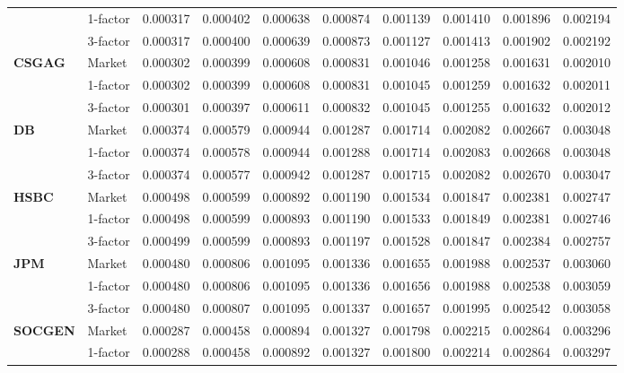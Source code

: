 \documentclass[12pt,a4paper]{article}
\theoremstyle{plain}
\numberwithin{equation}{section}
\begin{document}
{\begin{table}[t]
{\begin{tabular}{|rl|cccccccc|}
\cmidrule{3-10}          & 1-factor & 0.000317 & 0.000402 & 0.000638 & 0.000874 & 0.001139 & 0.001410 & 0.001896 & 0.002194 \\
          & 3-factor & 0.000317 & 0.000400 & 0.000639 & 0.000873 & 0.001127 & 0.001413 & 0.001902 & 0.002192 \\
    \hline
    \hline
    \multicolumn{1}{|l}{\textbf{CSGAG}} & Market & 0.000302 & 0.000399 & 0.000608 & 0.000831 & 0.001046 & 0.001258 & 0.001631 & 0.002010 \\
\cmidrule{3-10}          & 1-factor & 0.000302 & 0.000399 & 0.000608 & 0.000831 & 0.001045 & 0.001259 & 0.001632 & 0.002011 \\
          & 3-factor & 0.000301 & 0.000397 & 0.000611 & 0.000832 & 0.001045 & 0.001255 & 0.001632 & 0.002012 \\
    \hline
 \hline
    \multicolumn{1}{|l}{\textbf{DB}} & Market & 0.000374 & 0.000579 & 0.000944 & 0.001287 & 0.001714 & 0.002082 & 0.002667 & 0.003048 \\
\cmidrule{3-10}          & 1-factor & 0.000374 & 0.000578 & 0.000944 & 0.001288 & 0.001714 & 0.002083 & 0.002668 & 0.003048 \\
          & 3-factor & 0.000374 & 0.000577 & 0.000942 & 0.001287 & 0.001715 & 0.002082 & 0.002670 & 0.003047 \\
    \hline
   \hline
    \multicolumn{1}{|l}{\textbf{HSBC}} & Market & 0.000498 & 0.000599 & 0.000892 & 0.001190 & 0.001534 & 0.001847 & 0.002381 & 0.002747 \\
\cmidrule{3-10}          & 1-factor & 0.000498 & 0.000599 & 0.000893 & 0.001190 & 0.001533 & 0.001849 & 0.002381 & 0.002746 \\
          & 3-factor & 0.000499 & 0.000599 & 0.000893 & 0.001197 & 0.001528 & 0.001847 & 0.002384 & 0.002757 \\
    \hline
    \hline
    \multicolumn{1}{|l}{\textbf{JPM}} & Market & 0.000480 & 0.000806 & 0.001095 & 0.001336 & 0.001655 & 0.001988 & 0.002537 & 0.003060 \\
\cmidrule{3-10}          & 1-factor & 0.000480 & 0.000806 & 0.001095 & 0.001336 & 0.001656 & 0.001988 & 0.002538 & 0.003059 \\
          & 3-factor & 0.000480 & 0.000807 & 0.001095 & 0.001337 & 0.001657 & 0.001995 & 0.002542 & 0.003058 \\
    \hline
    \hline
    \multicolumn{1}{|l}{\textbf{SOCGEN}} & Market & 0.000287 & 0.000458 & 0.000894 & 0.001327 & 0.001798 & 0.002215 & 0.002864 & 0.003296 \\
\cmidrule{3-10}          & 1-factor & 0.000288 & 0.000458 & 0.000892 & 0.001327 & 0.001800 & 0.002214 & 0.002864 & 0.003297 \\

\end{tabular}}
\end{table}}
\end{document}
